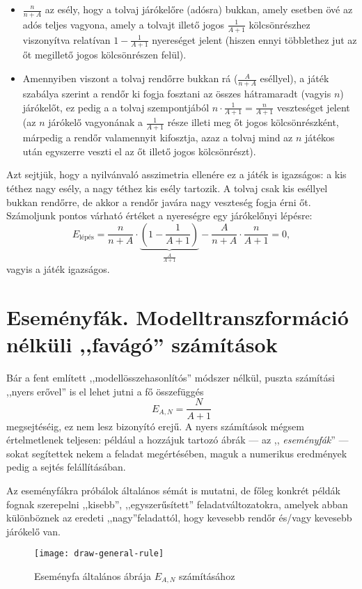 \documentclass{article}
\newcommand{\parenthesed}[1]{\left(#1\right)}
\begin{document}
	\begin{itemize}	
		\item $\frac{n}{n+A}$ az esély, hogy a tolvaj járókelőre (adósra) bukkan, amely esetben övé az adós teljes vagyona, amely a tolvajt illető jogos $\frac1{A+1}$ kölcsönrészhez viszonyítva relatívan  $1-\frac1{A+1}$ nyereséget jelent (hiszen ennyi többlethez jut az őt megillető jogos kölcsönrészen felül).
		\item Amennyiben viszont a tolvaj rendőrre bukkan rá ($\frac A{n+A}$ eséllyel), a játék szabálya szerint a rendőr ki fogja fosztani az összes hátramaradt (vagyis $n$) járókelőt, ez pedig a a tolvaj szempontjából $n\cdot\frac1{A+1} = \frac n{A+1}$ veszteséget jelent (az $n$ járókelő vagyonának a $\frac1{A+1}$ része illeti meg őt jogos kölcsönrészként, márpedig a rendőr valamennyit kifosztja, azaz a tolvaj mind az $n$ játékos után egyszerre veszti el az őt illető jogos kölcsönrészt).
	\end{itemize}
	Azt sejtjük, hogy a nyilvánvaló asszimetria ellenére ez a játék is igazságos: a kis téthez nagy esély, a nagy téthez kis esély tartozik. A tolvaj csak kis eséllyel bukkan rendőrre, de akkor a rendőr javára nagy veszteség fogja érni őt.
	Számoljunk pontos várható értéket a nyereségre egy járókelőnyi lépésre:
	\[E_{\text{lépés}} = \frac{n}{n+A}\cdot\underbrace{\parenthesed{1-\frac1{A+1}}}_{\frac A{A+1}} - \frac A{n+A}\cdot\frac n{A+1} = 0,\]
	vagyis a játék igazságos.	


	\section{Eseményfák. Modelltranszformáció nélküli ,,favágó'' számítások}

	Bár a fent említett ,,modellösszehasonlítós'' módszer nélkül, puszta számítási ,,nyers erővel'' is el lehet jutni a fő összefüggés
	\[
		E_{A,N} = \frac N{A+1}
	\]
	megsejtéséig, ez nem lesz bizonyító erejű. A nyers számítások mégsem értelmetlenek teljesen:
	például a hozzájuk tartozó ábrák --- az ,, \emph{eseményfák}'' --- sokat segítettek nekem a feladat megértésében,
	maguk a numerikus eredmények pedig a sejtés felállításában.

	Az eseményfákra próbálok általános sémát is mutatni, de főleg konkrét példák fognak szerepelni ,,kisebb'', ,,egyszerűsített'' feladatváltozatokra,
	amelyek abban különböznek az eredeti ,,nagy''feladattól, hogy kevesebb rendőr és/vagy  kevesebb járókelő van.

	\begin{figure}[H]
		\caption*{Eseményfa általános ábrája $E_{A,N}$ számításához}
		\centering
		\texttt{[image: draw-general-rule]}
	\end{figure}
\end{document}
